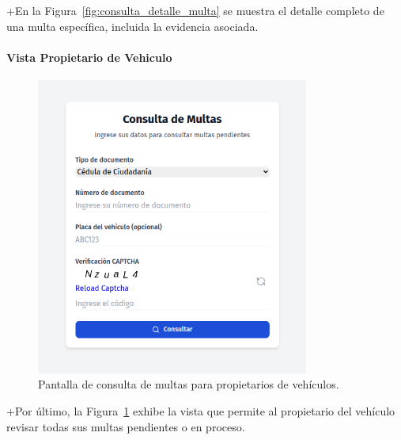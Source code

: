 +En la Figura~\ref{fig:consulta_detalle_multa} se muestra el detalle completo de una multa específica, incluida la evidencia asociada.
\paragraph{Vista Propietario de Vehiculo}
\begin{figure}[htbp]
    \centering
    \includegraphics[width=0.8\textwidth]{Images/UI5.png}
    \caption{Pantalla de consulta de multas para propietarios de vehículos.}
    \label{fig:consulta_multas_propietario}
\end{figure}
+Por último, la Figura~\ref{fig:consulta_multas_propietario} exhibe la vista que permite al propietario del vehículo revisar todas sus multas pendientes o en proceso. 
